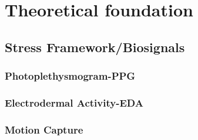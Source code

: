 \chapter{Theoretical foundation}

\section{Stress Framework/Biosignals}
\subsection{Photoplethysmogram-PPG}
\subsection{Electrodermal Activity-EDA}
\subsection{Motion Capture}


